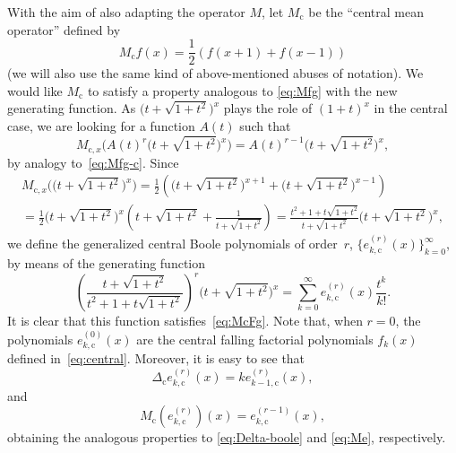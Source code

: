 \documentclass[11pt]{article}
\theoremstyle{plain}
\theoremstyle{remark}
\numberwithin{equation}{section} %
\begin{document}
With the aim of also adapting the operator $M$, let $M_{\mathrm{c}}$ be the ``central mean operator'' defined by
\[
M_{\mathrm{c}}f(x) = \frac{1}{2}(f(x+1)+f(x-1))
\]
(we will also use the same kind of above-mentioned abuses of notation). We would like $M_{\mathrm{c}}$ to satisfy a property analogous to \eqref{eq:Mfg} with the new generating function. As $\big(t+\sqrt{1+t^2}\big)^x$ plays the role of $(1+t)^x$ in the central case, we are looking for a function $A(t)$ such that
\begin{equation}
\label{eq:McFg}
  M_{\mathrm{c},x}\big(A(t)^r\big(t+\sqrt{1+t^2}\big)^x\big) 
  = A(t)^{r-1}\big(t+\sqrt{1+t^2}\big)^x,
\end{equation}
by analogy to~\eqref{eq:Mfg-c}.
Since
\begin{multline}
\label{eq:McFg2}
  M_{\mathrm{c},x}\big(\big(t+\sqrt{1+t^2}\big)^x\big)
  = \frac{1}{2} \left(\big(t+\sqrt{1+t^2}\big)^{x+1} + \big(t+\sqrt{1+t^2}\big)^{x-1}\right) \\
  = \frac{1}{2} \big(t+\sqrt{1+t^2}\big)^x \left(t+\sqrt{1+t^2}+\frac{1}{t+\sqrt{1+t^2}}\right)
  = \frac{t^2+1+t\sqrt{1+t^2}}{t+\sqrt{1+t^2}} \big(t+\sqrt{1+t^2}\big)^x,
\end{multline}
we define the generalized central Boole polynomials of order~$r$, $\{e^{(r)}_{k,\mathrm{c}}(x)\}_{k=0}^{\infty}$, by means of the generating function
\begin{equation}
\label{eq:CBfg}
  \left(\frac{t+\sqrt{1+t^2}}{t^2+1+t\sqrt{1+t^2}}\right)^r \big(t+\sqrt{1+t^2}\big)^x
  = \sum_{k=0}^{\infty} e^{(r)}_{k,\mathrm{c}}(x)\frac{t^k}{k!}.
\end{equation}
It is clear that this function satisfies~\eqref{eq:McFg}. 
Note that, when $r=0$, the polynomials $e^{(0)}_{k,\mathrm{c}}(x)$ are the central falling factorial polynomials $f_k(x)$ defined in~\eqref{eq:central}.
Moreover, it is easy to see that
\begin{equation*}
  \Delta_{\mathrm{c}} e^{(r)}_{k,\mathrm{c}}(x) = ke^{(r)}_{k-1,\mathrm{c}}(x),
\end{equation*}
and
\begin{equation}
\label{eq:M-B-c}
  M_{\mathrm{c}}(e^{(r)}_{k,\mathrm{c}})(x) = e^{(r-1)}_{k,\mathrm{c}}(x),
\end{equation}
obtaining the analogous properties to \eqref{eq:Delta-boole} and \eqref{eq:Me}, respectively.
\end{document}
